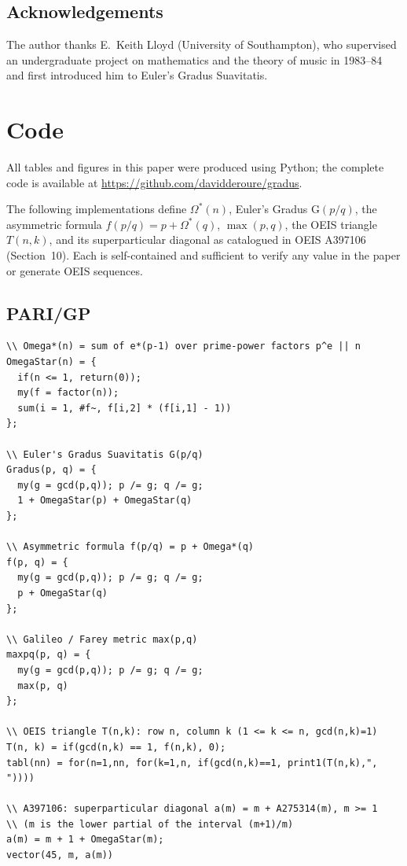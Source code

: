 \documentclass[11pt,a4paper]{article}
\newcommand{\Os}{\Omega^{\!*}}
\newcommand{\G}{\mathrm{G}}
\begin{document}

\subsection*{Acknowledgements}

The author thanks E.\ Keith Lloyd (University of Southampton), who
supervised an undergraduate project on mathematics and the theory of
music in 1983--84 and first introduced him to Euler's Gradus Suavitatis.


\appendix

\section{Code}
\label{app:code}

All tables and figures in this paper were produced using Python; the complete
code is available at \url{https://github.com/davidderoure/gradus}.

The following implementations define $\Os(n)$, Euler's Gradus $\G(p/q)$,
the asymmetric formula $f(p/q) = p + \Os(q)$, $\max(p,q)$, the
OEIS triangle $T(n,k)$, and its superparticular diagonal as catalogued in
OEIS A397106 (Section~10). Each is self-contained and sufficient to
verify any value in the paper or generate OEIS sequences.

\subsection*{PARI/GP}

\begin{verbatim}
\\ Omega*(n) = sum of e*(p-1) over prime-power factors p^e || n
OmegaStar(n) = {
  if(n <= 1, return(0));
  my(f = factor(n));
  sum(i = 1, #f~, f[i,2] * (f[i,1] - 1))
};

\\ Euler's Gradus Suavitatis G(p/q)
Gradus(p, q) = {
  my(g = gcd(p,q)); p /= g; q /= g;
  1 + OmegaStar(p) + OmegaStar(q)
};

\\ Asymmetric formula f(p/q) = p + Omega*(q)
f(p, q) = {
  my(g = gcd(p,q)); p /= g; q /= g;
  p + OmegaStar(q)
};

\\ Galileo / Farey metric max(p,q)
maxpq(p, q) = {
  my(g = gcd(p,q)); p /= g; q /= g;
  max(p, q)
};

\\ OEIS triangle T(n,k): row n, column k (1 <= k <= n, gcd(n,k)=1)
T(n, k) = if(gcd(n,k) == 1, f(n,k), 0);
tabl(nn) = for(n=1,nn, for(k=1,n, if(gcd(n,k)==1, print1(T(n,k),", "))))

\\ A397106: superparticular diagonal a(m) = m + A275314(m), m >= 1
\\ (m is the lower partial of the interval (m+1)/m)
a(m) = m + 1 + OmegaStar(m);
vector(45, m, a(m))
\end{verbatim}
\end{document}
